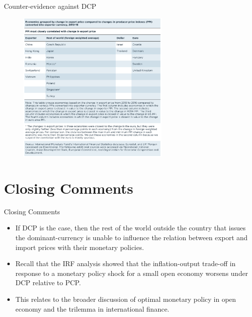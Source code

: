 \documentclass{beamer}
\begin{document}
\begin{frame}{Counter-evidence against DCP}
    \begin{figure}[htp]
        \centering
        \includegraphics[width=7.5cm]{Group.png}
    \end{figure}
\end{frame}
\section{Closing Comments}
\begin{frame}{Closing Comments}
\begin{itemize}
    \item If DCP is the case, then the rest of the world outside the country that issues the dominant-currency is unable to influence the relation between export and import prices with their monetary policies.
    \item Recall that the IRF analysis showed that the inflation-output trade-off in response to a monetary policy shock for a small open economy worsens under DCP relative to PCP.
    \item This relates to the broader discussion of optimal monetary policy in open economy and the trilemma in international finance.
\end{itemize}
    
\end{frame}
\end{document}
